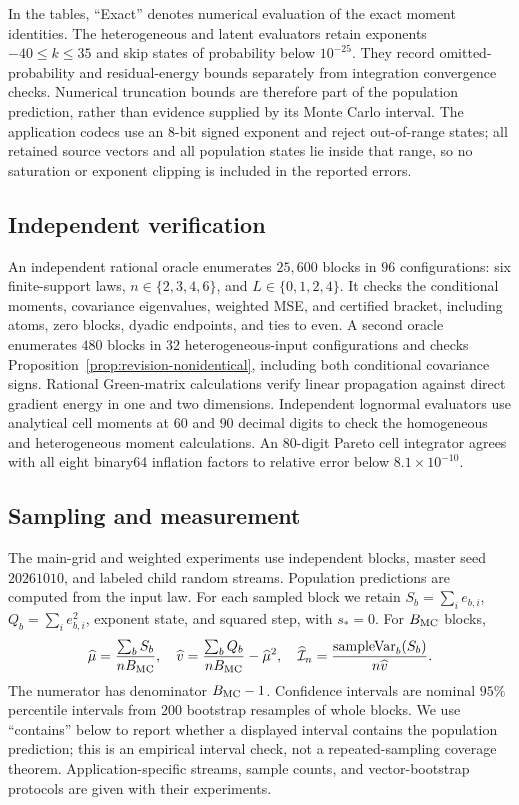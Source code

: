 In the tables, ``Exact'' denotes numerical evaluation of the exact moment
identities. The heterogeneous and latent evaluators retain exponents
$-40\le k\le35$ and skip states of probability below $10^{-25}$.
They record omitted-probability and residual-energy bounds separately from
integration convergence checks. Numerical truncation bounds are therefore
part of the population prediction, rather than evidence supplied by its
Monte Carlo interval.
The application codecs use an 8-bit signed exponent and reject out-of-range
states; all retained source vectors and all population states lie inside that
range, so no saturation or exponent clipping is included in the reported
errors.

\subsection{Independent verification}
An independent rational oracle enumerates $25{,}600$ blocks in $96$
configurations: six finite-support laws,
$n\in\{2,3,4,6\}$, and $L\in\{0,1,2,4\}$.
It checks the conditional moments, covariance eigenvalues, weighted MSE,
and certified bracket, including atoms, zero blocks, dyadic endpoints,
and ties to even. A second oracle enumerates $480$ blocks in $32$
heterogeneous-input configurations and checks
Proposition~\ref{prop:revision-nonidentical}, including both conditional
covariance signs. Rational Green-matrix calculations verify linear
propagation against direct gradient energy in one and two dimensions.
Independent lognormal evaluators use analytical cell moments at $60$ and
$90$ decimal digits to check the homogeneous and heterogeneous moment
calculations. An $80$-digit Pareto cell integrator agrees with all eight
binary64 inflation factors to relative error below $8.1\times10^{-10}$.

\subsection{Sampling and measurement}
The main-grid and weighted experiments use independent blocks, master seed
$20261010$, and labeled child random streams. Population predictions are
computed from the input law. For each sampled block we retain
$S_b=\sum_i e_{b,i}$, $Q_b=\sum_i e_{b,i}^2$, exponent state, and squared
step, with $s_*=0$. For $B_{\rm MC}$ blocks,
\begin{equation}\label{eq:mc-estimator}
 \widehat\mu=\frac{\sum_b S_b}{nB_{\rm MC}},\quad
 \widehat v=\frac{\sum_b Q_b}{nB_{\rm MC}}-\widehat\mu^2,\quad
 \widehat{\mathcal I}_n=
   \frac{\operatorname{sampleVar}_b(S_b)}{n\widehat v}.
\end{equation}
The numerator has denominator $B_{\rm MC}-1$. Confidence intervals are
nominal $95\%$ percentile intervals from $200$ bootstrap resamples of whole
blocks. We use ``contains'' below to report whether a displayed interval
contains the population prediction; this is an empirical interval check,
not a repeated-sampling coverage theorem. Application-specific streams,
sample counts, and vector-bootstrap protocols are given with their
experiments.

